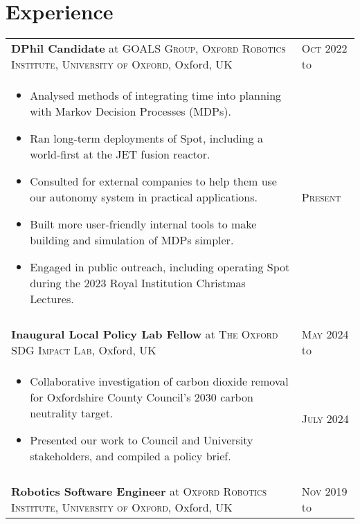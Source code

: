 \documentclass[a4paper,10pt]{article}
\newcommand{\datelen}{1.8cm}
\newcommand{\descrlen}{15.5cm}
\begin{document}
\section{Experience}
\begin{tabular}{p{\descrlen}|p{\datelen}}
  \textbf{DPhil Candidate} at \textsc{GOALS Group, Oxford Robotics Institute, University of Oxford}, Oxford, UK& \textsc{Oct 2022} to\\
  \small{
  \vspace{-0.4cm}
  \begin{itemize}
    \item Analysed methods of integrating time into planning with Markov Decision Processes (MDPs).
    \item Ran long-term deployments of Spot, including a world-first at the JET fusion reactor.
    \item Consulted for external companies to help them use our autonomy system in practical applications.
    \item Built more user-friendly internal tools to make building and simulation of MDPs simpler.
    \item Engaged in public outreach, including operating Spot during the 2023 Royal Institution Christmas Lectures.
    \vspace{-0.5cm}
  \end{itemize}
  }& \textsc{Present}
  \\
  \multicolumn{2}{c}{}\\[-0.2cm]
  \textbf{Inaugural Local Policy Lab Fellow} at \textsc{The Oxford SDG Impact Lab}, Oxford, UK& \textsc{May 2024} to\\
  \small{
  \vspace{-0.4cm}
  \begin{itemize}
  \item Collaborative investigation of carbon dioxide removal for Oxfordshire County Council's 2030 carbon neutrality target.
  \item Presented our work to Council and University stakeholders, and compiled a policy brief.
    \vspace{-0.5cm}
  \end{itemize}
  }& \textsc{July 2024}
  \\
  \multicolumn{2}{c}{}\\[-0.2cm]
  \textbf{Robotics Software Engineer} at \textsc{Oxford Robotics Institute, University of Oxford}, Oxford, UK&\textsc{Nov 2019} to\\

\end{tabular}
\end{document}
